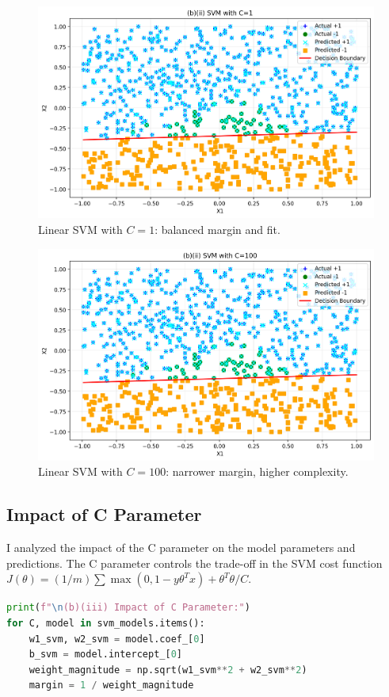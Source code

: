\documentclass[12pt,a4paper]{article}
\begin{document}
\begin{figure}[H]
    \centering
    \includegraphics[width=0.7\linewidth]{svm_c_1.png}
    \caption{Linear SVM with \(C=1\): balanced margin and fit.}
    \label{fig:svm_c_1}
\end{figure}

\begin{figure}[H]
    \centering
    \includegraphics[width=0.7\linewidth]{svm_c_100.png}
    \caption{Linear SVM with \(C=100\): narrower margin, higher complexity.}
    \label{fig:svm_c_100}
\end{figure}

\subsection{Impact of C Parameter}

I analyzed the impact of the C parameter on the model parameters and predictions. The C parameter controls the trade-off in the SVM cost function $J(\theta) = (1/m)\sum\max(0,1-y\theta^T x) + \theta^T\theta/C$.

\begin{lstlisting}[language=Python, caption={Impact of C parameter analysis}]
print(f"\n(b)(iii) Impact of C Parameter:")
for C, model in svm_models.items():
    w1_svm, w2_svm = model.coef_[0]
    b_svm = model.intercept_[0]
    weight_magnitude = np.sqrt(w1_svm**2 + w2_svm**2)
    margin = 1 / weight_magnitude
\end{lstlisting}
\end{document}
